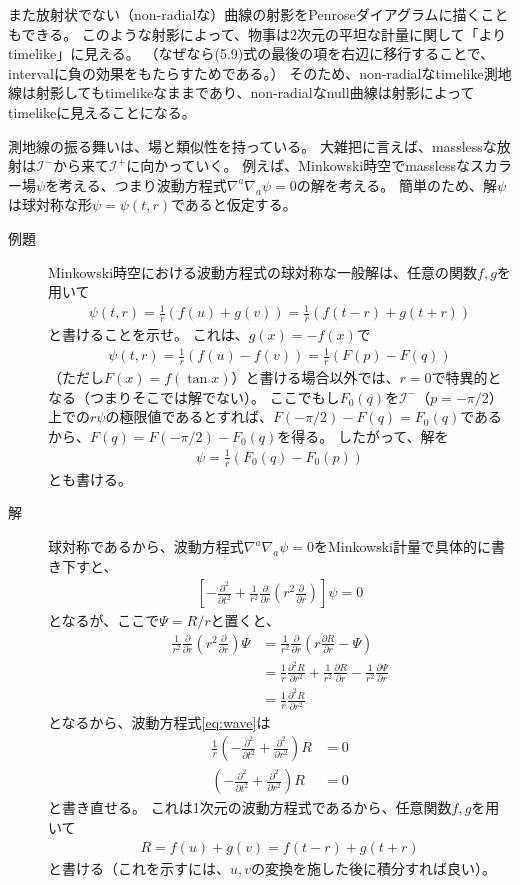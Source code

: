 \documentclass[a4paper, 12pt]{jsarticle}
\newcommand{\pdif}[2]{\frac{\partial #1}{\partial #2}}
\begin{document}
また放射状でない（non-radialな）曲線の射影をPenroseダイアグラムに描くこともできる。
このような射影によって、物事は2次元の平坦な計量に関して「よりtimelike」に見える。
（なぜなら(5.9)式の最後の項を右辺に移行することで、intervalに負の効果をもたらすためである。）
そのため、non-radialなtimelike測地線は射影してもtimelikeなままであり、non-radialなnull曲線は射影によってtimelikeに見えることになる。

測地線の振る舞いは、場と類似性を持っている。
大雑把に言えば、masslessな放射は$\mathcal{I}^-$から来て$\mathcal{I}^+$に向かっていく。
例えば、Minkowski時空でmasslessなスカラー場$\psi$を考える、つまり波動方程式$\nabla^a \nabla_a \psi = 0$の解を考える。
簡単のため、解$\psi$は球対称な形$\psi = \psi(t, r)$であると仮定する。
\begin{description}
	\item[例題] Minkowski時空における波動方程式の球対称な一般解は、任意の関数$f, g$を用いて
	\begin{align}
		\psi(t, r) = \frac{1}{r} (f(u) + g(v))
		= \frac{1}{r} (f(t-r) + g(t+r)) \tag{5.10}
	\end{align} 
	と書けることを示せ。
	これは、$g(x) = -f(x)$で
	\begin{align}
		\psi(t, r) = \frac{1}{r} (f(u) - f(v))
		= \frac{1}{r} (F(p) - F(q)) \tag{5.11}
	\end{align}
	（ただし$F(x) = f(\tan x)$）と書ける場合以外では、$r=0$で特異的となる（つまりそこでは解でない）。
	ここでもし$F_0(q)$を$\mathcal{I}^-$（$p = -\pi/2$）上での$r\psi$の極限値であるとすれば、$F(-\pi/2) - F(q) = F_0(q)$であるから、$F(q) = F(-\pi/2) - F_0(q)$を得る。
	したがって、解を
	\begin{align}
		\psi = \frac{1}{r} (F_0(q) - F_0(p)) \tag{5.12}
	\end{align}
	とも書ける。
	\item[解] 球対称であるから、波動方程式$\nabla^a \nabla_a \psi = 0$をMinkowski計量で具体的に書き下すと、
	\begin{align}
		\left[ -\pdif{^2}{t^2} + \frac{1}{r^2} \pdif{}{r} \left( r^2 \pdif{}{r}\right) \right] \psi = 0 \label{eq:wave}
	\end{align} 
	となるが、ここで$\Psi = R/r$と置くと、
	\begin{align}
		\frac{1}{r^2} \pdif{}{r} \left( r^2 \pdif{}{r} \right) \Psi
		&= \frac{1}{r^2} \pdif{}{r} \left( r \pdif{R}{r} - \Psi \right) \\
		&= \frac{1}{r} \pdif{^2 R}{r^2} + \frac{1}{r^2} \pdif{R}{r} - \frac{1}{r^2} \pdif{\Psi}{r} \\
		&= \frac{1}{r} \pdif{^2 R}{r^2}
	\end{align}
	となるから、波動方程式\eqref{eq:wave}は
	\begin{align}
		\frac{1}{r} \left( -\pdif{^2}{t^2} + \pdif{^2}{r^2} \right) R &= 0 \\
		\left( -\pdif{^2}{t^2} + \pdif{^2}{r^2} \right) R &= 0
	\end{align}
	と書き直せる。
	これは1次元の波動方程式であるから、任意関数$f, g$を用いて
	\begin{align}
		R = f(u) + g(v) = f(t - r) + g(t + r)
	\end{align}
	と書ける（これを示すには、$u, v$の変換を施した後に積分すれば良い）。
\end{description}
\end{document}
